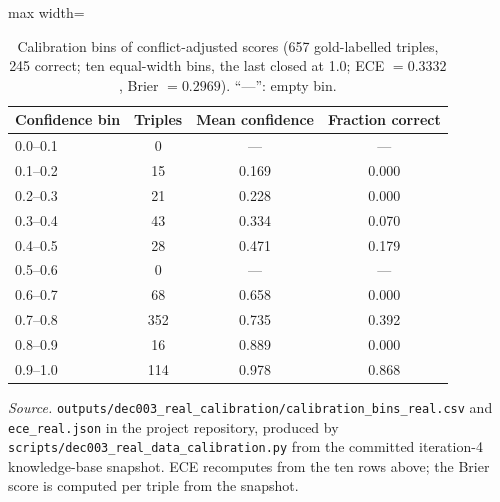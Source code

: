 \documentclass[11pt]{article}
\begin{document}
\begin{table}[htbp]
\centering
\caption{Calibration bins of conflict-adjusted scores (657 gold-labelled
triples, 245 correct; ten equal-width bins, the last closed at 1.0;
ECE $=0.3332$, Brier $=0.2969$). ``---'': empty bin.}
\label{tab:s1-calibration}
\begin{adjustbox}{max width=\textwidth}
\begin{tabular}{@{}lccc@{}}
\toprule
Confidence bin & Triples & Mean confidence & Fraction correct \\
\midrule
0.0--0.1 & 0 & --- & --- \\
0.1--0.2 & 15 & 0.169 & 0.000 \\
0.2--0.3 & 21 & 0.228 & 0.000 \\
0.3--0.4 & 43 & 0.334 & 0.070 \\
0.4--0.5 & 28 & 0.471 & 0.179 \\
0.5--0.6 & 0 & --- & --- \\
0.6--0.7 & 68 & 0.658 & 0.000 \\
0.7--0.8 & 352 & 0.735 & 0.392 \\
0.8--0.9 & 16 & 0.889 & 0.000 \\
0.9--1.0 & 114 & 0.978 & 0.868 \\
\bottomrule
\end{tabular}
\end{adjustbox}

\noindent\emph{Source.} \texttt{outputs/dec003\_real\_calibration/calibration\_bins\_real.csv}
and \texttt{ece\_real.json} in the project repository, produced by
\texttt{scripts/dec003\_real\_data\_calibration.py} from the committed
iteration-4 knowledge-base snapshot. ECE recomputes from the ten rows
above; the Brier score is computed per triple from the snapshot.
\end{table}
\end{document}
